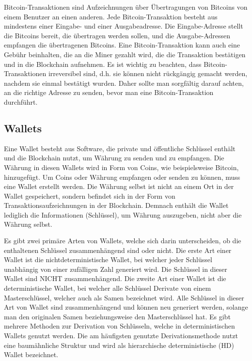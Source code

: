 Bitcoin-Transaktionen sind Aufzeichnungen über Übertragungen von Bitcoins von einem Benutzer an einen anderen. Jede
Bitcoin-Transaktion besteht aus mindestens einer Eingabe- und einer Ausgabeadresse. Die Eingabe-Adresse stellt die Bitcoins
bereit, die übertragen werden sollen, und die Ausgabe-Adressen empfangen die übertragenen Bitcoins. Eine Bitcoin-Transaktion
kann auch eine Gebühr beinhalten, die an die Miner gezahlt wird, die die Transaktion bestätigen und in die Blockchain aufnehmen.
Es ist wichtig zu beachten, dass Bitcoin-Transaktionen irreversibel sind, d.h. sie können nicht rückgängig gemacht werden,
nachdem sie einmal bestätigt wurden. Daher sollte man sorgfältig darauf achten, an die richtige Adresse zu senden, bevor man eine
Bitcoin-Transaktion durchführt.

\subsection{Wallets}
Eine Wallet besteht aus Software, die private und öffentliche Schlüssel enthält und die Blockchain nutzt, um Währung zu senden
und zu empfangen. Die Währung in diesen Wallets wird in Form von Coins, wie beispielsweise Bitcoin, hinzugefügt. Um Coins oder
Währung empfangen oder senden zu können, muss eine Wallet erstellt werden. Die Währung selbst ist nicht an einem Ort in der Wallet
gespeichert, sondern befindet sich in der Form von Transaktionsaufzeichnungen in der Blockchain.  Demnach enthält 
die Wallet lediglich die Informationen (Schlüssel), um Währung auszugeben, nicht aber die Währung selbst.

Es gibt zwei primäre Arten von Wallets, welche sich darin unterscheiden, ob die enthaltenen Schlüssel zusammenhängend sind oder
nicht. Die erste Art einer Wallet ist die nichtdeterministische Wallet, bei welcher jeder Schlüssel unabhängig von einer 
zufälligen Zahl generiert wird. Die Schlüssel in dieser Wallet sind NICHT zusammenhängend. Die zweite Art einer Wallet ist die
deterministische Wallet, bei welcher alle Schlüssel Derivate von einem Masterschlüssel, welcher auch als Samen bezeichnet wird.
Alle Schlüssel in dieser Art von Wallet sind zusammenhängend und können neu generiert werden, solange man den originalen Samen
beziehungsweise den Masterschlüssel hat. Es gibt mehrere Methoden zur Derivation von Schlüsseln, welche in deterministischen
Wallets genutzt werden. Die am häufigsten genutzte Derivationsmethode nutzt eine baumähnliche Struktur und wird als 
hierarchische deterministische (HD) Wallet bezeichnet. 

